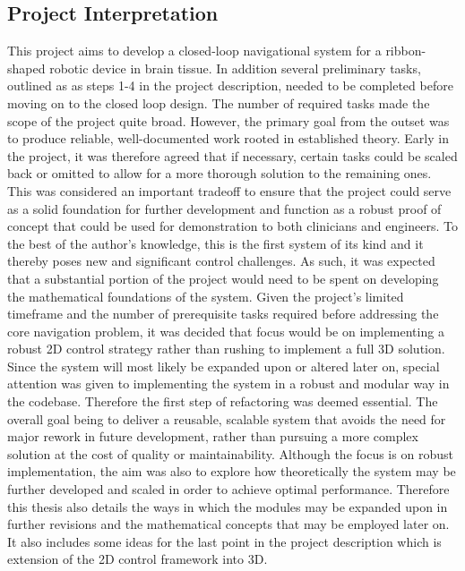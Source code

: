 \subsection{Project Interpretation}

This project aims to develop a closed-loop navigational system for a ribbon-shaped robotic device in brain tissue. In addition several preliminary tasks, outlined as  as steps 1-4 in the project description, needed to be completed before moving on to the closed loop design. The number of required tasks made the scope of the project quite broad. However, the primary goal from the outset was to produce reliable, well-documented work rooted in established theory. Early in the project, it was therefore agreed that if necessary, certain tasks could be scaled back or omitted to allow for a more thorough solution to the remaining ones. This was considered an important tradeoff to ensure that the project could serve as a solid foundation for further development and function as a robust proof of concept that could be used for demonstration to both clinicians and engineers.
\newline \newline
To the best of the author's knowledge, this is the first system of its kind and it thereby poses new and significant control challenges. As such, it was expected that a substantial portion of the project would need to be spent on developing the mathematical foundations of the system. Given the project's limited timeframe and the number of prerequisite tasks required before addressing the core navigation problem, it was decided that focus would be on implementing a robust 2D control strategy rather than rushing to implement a full 3D solution. Since the system will most likely be expanded upon or altered later on, special attention was  given to implementing the system in a robust and modular way in the codebase. Therefore the first step of refactoring was deemed essential. The overall goal being to deliver a reusable, scalable system that avoids the need for major rework in future development, rather than pursuing a more complex solution at the cost of quality or maintainability. 
\newline \newline
Although the focus is on robust implementation, the aim was also to explore how theoretically the system may be further developed and scaled in order to achieve optimal performance. Therefore this thesis also details the ways in which the modules may be expanded upon in further revisions and the mathematical concepts that may be employed later on. It also includes some ideas for the last point in the project description which is extension of the 2D control framework into 3D.


